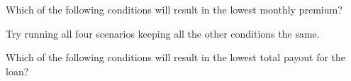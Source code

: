 \documentclass{ximera}
\begin{document}
\begin{question}
Which of the following conditions will result in the lowest monthly premium?

\begin{multipleChoice}
\end{multipleChoice}
\begin{hint}
Try running all four scenarios keeping all the other conditions the same.
\end{hint}

\end{question}

\begin{question}
Which of the following conditions will result in the lowest total payout for the loan?

\begin{multipleChoice}
\end{multipleChoice}

\end{question}
\end{document}
